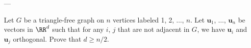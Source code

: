 
---

Let $G$ be a triangle-free graph on $n$ vertices labeled 1, 2, $\ldots$, $n$.
Let $\mathbf u_1$, $\ldots$, $\mathbf u_n$ be vectors in $\RR^d$
such that for any $i$, $j$ that are not adjacent in $G$,
we have $\mathbf u_i$ and $\mathbf u_j$ orthogonal.
Prove that $d\ge n/2$.
